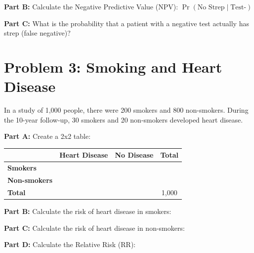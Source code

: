 \documentclass[11pt]{article}
\begin{document}
\vspace{12pt}

\textbf{Part B:} Calculate the Negative Predictive Value (NPV): $\Pr(\text{No Strep} \mid \text{Test-})$

\vspace{2.5cm}

\textbf{Part C:} What is the probability that a patient with a negative test actually has strep (false negative)?

\vspace{2cm}

\section{Problem 3: Smoking and Heart Disease}

In a study of 1,000 people, there were 200 smokers and 800 non-smokers. During the 10-year follow-up, 30 smokers and 20 non-smokers developed heart disease.

\vspace{12pt}

\textbf{Part A:} Create a 2x2 table:

\vspace{12pt}

\begin{center}
\begin{tabular}{|l|c|c|c|}
\hline
& \textbf{Heart Disease} & \textbf{No Disease} & \textbf{Total} \\
\hline
\textbf{Smokers} & & & \\[2ex]
\hline
\textbf{Non-smokers} & & & \\[2ex]
\hline
\textbf{Total} & & & 1,000 \\[2ex]
\hline
\end{tabular}
\end{center}

\vspace{12pt}

\textbf{Part B:} Calculate the risk of heart disease in smokers:

\vspace{1.5cm}

\textbf{Part C:} Calculate the risk of heart disease in non-smokers:

\vspace{1.5cm}

\textbf{Part D:} Calculate the Relative Risk (RR):

\vspace{1.5cm}
\end{document}
